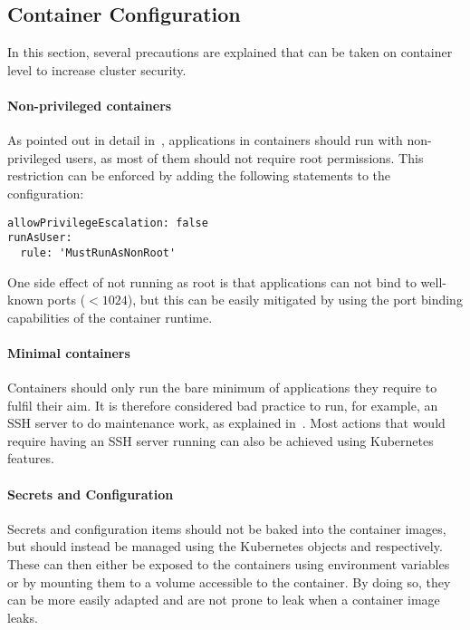 \subsection{Container Configuration}

In this section, several precautions are explained that can be taken on container level to increase cluster security.

\paragraph{Non-privileged containers}

As pointed out in detail in~\textcite{nonPrivContainers}, applications in containers should run with non-privileged users, as most of them should not require root permissions. This restriction can be enforced by adding the following statements to the  configuration:

\begin{verbatim}
allowPrivilegeEscalation: false
runAsUser:
  rule: 'MustRunAsNonRoot'
\end{verbatim}

One side effect of not running as root is that applications can not bind to well-known ports ($< 1024$), but this can be easily mitigated by using the port binding capabilities of the container runtime.

\paragraph{Minimal containers}

Containers should only run the bare minimum of applications they require to fulfil their aim. It is therefore considered bad practice to run, for example, an SSH server to do maintenance work, as explained in~\textcite{noSSHDinContainers}. Most actions that would require having an SSH server running can also be achieved using Kubernetes features.

\paragraph{Secrets and Configuration}

Secrets and configuration items should not be baked into the container images, but should instead be managed using the Kubernetes objects  and  respectively. These can then either be exposed to the containers using environment variables or by mounting them to a volume accessible to the container. By doing so, they can be more easily adapted and are not prone to leak when a container image leaks.

